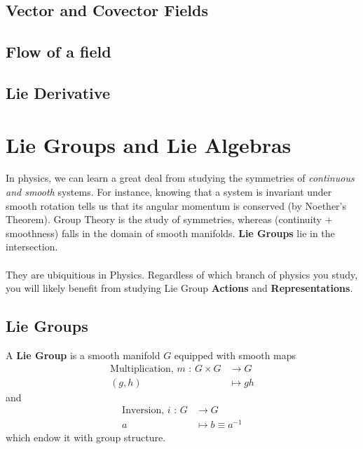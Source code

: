 \documentclass[11pt]{article}
\begin{document}
\vskip 1cm
\subsection{Vector and Covector Fields}

\vskip 1cm
\subsection{Flow of a field}

\vskip 1cm
\subsection{Lie Derivative}






\newpage
\section{Lie Groups and Lie Algebras}

In physics, we can learn a great deal from studying the symmetries of \emph{continuous and smooth} systems. For instance, knowing that a system is invariant under smooth rotation tells us that its angular momentum is conserved (by Noether's Theorem). Group Theory is the study of symmetries, whereas (continuity + smoothness) falls in the domain of smooth manifolds. \textbf{Lie Groups} lie in the intersection.
\\
\\
They are ubiquitious in Physics. Regardless of which branch of physics you study, you will likely benefit from studying Lie Group \textbf{Actions} and \textbf{Representations}.
\\
\subsection{Lie Groups}
\begin{redbox}
  A \textbf{Lie Group} is a smooth manifold $G$ equipped with smooth maps
  \begin{align*}
    \text{Multiplication, } m \text{ : } G \times G &\rightarrow G \\ 
    (g, h) &\mapsto gh 
  \end{align*} and 
  \begin{align*}
    \text{Inversion, } i \text{ : } G &\rightarrow G \\ 
    a &\mapsto  b \equiv a^{-1}
  \end{align*}
  which endow it with group structure.
\end{redbox}
\end{document}
